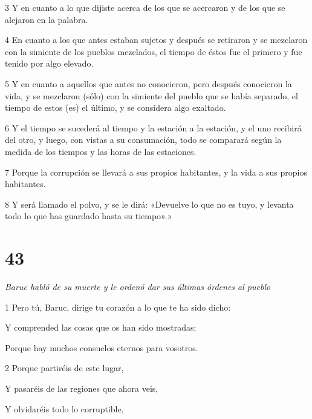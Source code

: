 \par 3 Y en cuanto a lo que dijiste acerca de los que se acercaron y de los que se alejaron en la palabra.

\par 4 En cuanto a los que antes estaban sujetos y después se retiraron y se mezclaron con la simiente de los pueblos mezclados, el tiempo de éstos fue el primero y fue tenido por algo elevado.

\par 5 Y en cuanto a aquellos que antes no conocieron, pero después conocieron la vida, y se mezclaron (sólo) con la simiente del pueblo que se había separado, el tiempo de estos (es) el último, y se considera algo exaltado.

\par 6 Y el tiempo se sucederá al tiempo y la estación a la estación, y el uno recibirá del otro, y luego, con vistas a su consumación, todo se comparará según la medida de los tiempos y las horas de las estaciones.

\par 7 Porque la corrupción se llevará a sus propios habitantes, y la vida a sus propios habitantes.

\par 8 Y será llamado el polvo, y se le dirá: «Devuelve lo que no es tuyo, y levanta todo lo que has guardado hasta su tiempo».»


\chapter{43}

\par \textit{Baruc habló de su muerte y le ordenó dar sus últimas órdenes al pueblo}

\par 1 Pero tú, Baruc, dirige tu corazón a lo que te ha sido dicho:

\par Y comprended las cosas que os han sido mostradas;

\par Porque hay muchos consuelos eternos para vosotros.

\par 2 Porque partiréis de este lugar,

\par Y pasaréis de las regiones que ahora veis,

\par Y olvidaréis todo lo corruptible,

